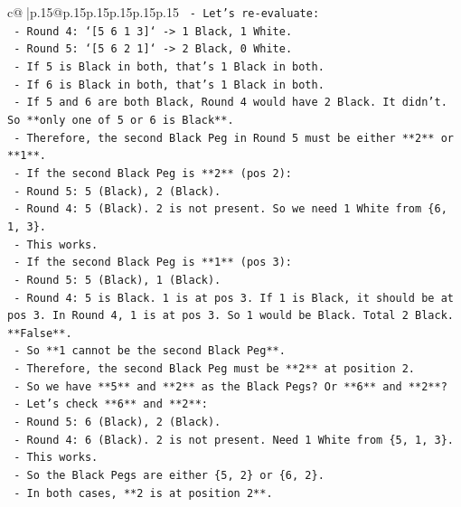 \documentclass{article}
\begin{document}
{\begin{supertabular}{c@{$\;$}|p{.15\linewidth}@{}p{.15\linewidth}p{.15\linewidth}p{.15\linewidth}p{.15\linewidth}p{.15\linewidth}}
{{{\texttt{    {-} Let's re{-}evaluate:} \\
\texttt{        {-} Round 4: `{[}5 6 1 3{]}` {-}> 1 Black, 1 White.} \\
\texttt{        {-} Round 5: `{[}5 6 2 1{]}` {-}> 2 Black, 0 White.} \\
\texttt{        {-} If 5 is Black in both, that's 1 Black in both.} \\
\texttt{        {-} If 6 is Black in both, that's 1 Black in both.} \\
\texttt{        {-} If 5 and 6 are both Black, Round 4 would have 2 Black. It didn't. So **only one of 5 or 6 is Black**.} \\
\texttt{        {-} Therefore, the second Black Peg in Round 5 must be either **2** or **1**.} \\
\texttt{        {-} If the second Black Peg is **2** (pos 2):} \\
\texttt{            {-} Round 5: 5 (Black), 2 (Black).} \\
\texttt{            {-} Round 4: 5 (Black). 2 is not present. So we need 1 White from \{6, 1, 3\}.} \\
\texttt{            {-} This works.} \\
\texttt{        {-} If the second Black Peg is **1** (pos 3):} \\
\texttt{            {-} Round 5: 5 (Black), 1 (Black).} \\
\texttt{            {-} Round 4: 5 is Black. 1 is at pos 3. If 1 is Black, it should be at pos 3. In Round 4, 1 is at pos 3. So 1 would be Black. Total 2 Black. **False**.} \\
\texttt{            {-} So **1 cannot be the second Black Peg**.} \\
\texttt{        {-} Therefore, the second Black Peg must be **2** at position 2.} \\
\texttt{        {-} So we have **5** and **2** as the Black Pegs? Or **6** and **2**?} \\
\texttt{        {-} Let's check **6** and **2**:} \\
\texttt{            {-} Round 5: 6 (Black), 2 (Black).} \\
\texttt{            {-} Round 4: 6 (Black). 2 is not present. Need 1 White from \{5, 1, 3\}.} \\
\texttt{            {-} This works.} \\
\texttt{        {-} So the Black Pegs are either \{5, 2\} or \{6, 2\}.} \\
\texttt{        {-} In both cases, **2 is at position 2**.} \\
}}}
\end{supertabular}}
\end{document}
